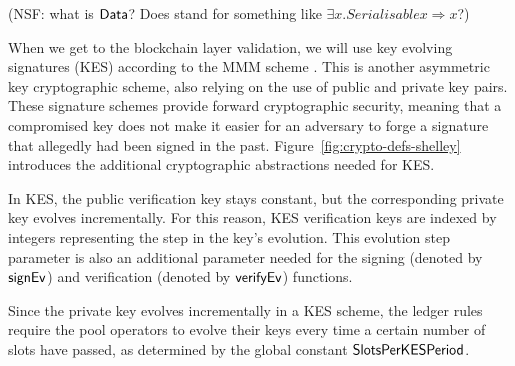 (NSF: what is $\mathsf{Data}$? Does stand for something like $\exists x. Serialisable x
\Rightarrow x$?)

When we get to the blockchain layer validation, we will use
key evolving signatures (KES) according to the MMM scheme \cite{cryptoeprint:2001:034}.
This is another asymmetric key cryptographic scheme, also relying on
the use of public and private key pairs.
These signature schemes provide forward cryptographic security, meaning that a
compromised key does not make it easier for an adversary to forge a signature that
allegedly had been signed in the past.
Figure~\ref{fig:crypto-defs-shelley} introduces the additional cryptographic abstractions
needed for KES.

In KES, the public verification key stays constant, but the
corresponding private key evolves incrementally. For this reason, KES
verification keys are indexed by integers representing the step in the key's
evolution. This evolution step parameter is also an additional parameter needed
for the signing (denoted by $\mathsf{signEv}$) and verification
(denoted by $\mathsf{verifyEv}$) functions.

Since the private key evolves incrementally in a KES scheme, the ledger rules
require the pool operators to evolve their keys every time a certain number of
slots have passed, as determined by the global constant $\mathsf{SlotsPerKESPeriod}$.

